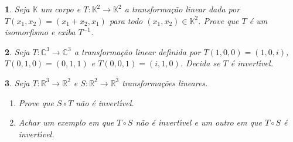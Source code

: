 \documentclass[12pt]{exam}
\newtheorem{exercicio}{}
\newcommand{\real}{\mathbb{R}}
\newcommand{\complex}{\mathbb{C}}
\newcommand{\cp}[1]{\mathbb{#1}}
\begin{document}
\begin{exercicio}
  Seja $\cp{K}$ um corpo e $T : \cp{K}^2 \to \cp{K}^2$ a transforma\c{c}\~ao linear dada por $T(x_1,x_2) = (x_1 + x_2, x_1)$ para todo $(x_1,x_2) \in \cp{K}^2$. Prove que $T$ \'e um isomorfismo e exiba $T^{-1}$.
\end{exercicio}

\begin{exercicio}
  Seja $T : \complex^3 \to \complex^3$ a transforma\c{c}\~ao linear definida por $T(1,0,0) = (1,0,i)$, $T(0,1,0) = (0,1,1)$ e $T(0,0,1) = (i,1,0)$. Decida se $T$ \'e invert{\'\i}vel.
\end{exercicio}

\begin{exercicio}
  Seja $T : \real^3 \to \real^2$ e $S : \real^2 \to \real^3$ transforma\c{c}\~oes lineares.
  \begin{enumerate}[label=({\alph*})]
    \item Prove que $S \circ T$ n\~ao \'e invert{\'\i}vel.
    \item Achar um exemplo em que $T\circ S$ n\~ao \'e invert{\'\i}vel e um outro em que $T\circ S$ \'e invert{\'\i}vel.
  \end{enumerate}
\end{exercicio}


\end{document}
